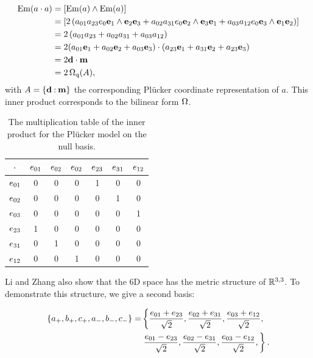 \begin{align*}
  \operatorname{Em}(a \mathbin{\cdot} a) &= \left[\operatorname{Em}(a) \wedge \operatorname{Em}(a)\right] \\
    &= \left[ 2 \left( a_{01} a_{23} e_0\mathbf{e}_1 \wedge \mathbf{e}_2\mathbf{e}_3 + a_{02} a_{31} e_0\mathbf{e}_2 \wedge \mathbf{e}_3\mathbf{e}_1 + a_{03} a_{12} e_0\mathbf{e}_3 \wedge \mathbf{e}_1\mathbf{e}_2 \right) \right] \\
    &= 2 \left( a_{01} a_{23} + a_{02} a_{31} + a_{03} a_{12} \right) \\
    &= 2 (a_{01} \mathbf{e}_1 + a_{02} \mathbf{e}_2 + a_{03} \mathbf{e}_3) \mathbin{\cdot} (a_{23} \mathbf{e}_1 + a_{31} \mathbf{e}_2 + a_{23} \mathbf{e}_3) \\
    &= 2 \mathbf{d} \mathbin{\cdot} \mathbf{m} \\ 
    &= 2 \operatorname{\Omega_q}(A),
\end{align*}
with $A = \{\mathbf{d} \mathbin{:} \mathbf{m}\}$ the corresponding Pl\"ucker coordinate representation of $a$.  This inner product corresponds to the bilinear form $\operatorname{\Omega}$.

\begin{table}[t]
  \caption{The multiplication table of the inner product for the Pl\"ucker model on the null basis.}
  \label{tab:nullmetric}
  \begin{center}
    \begin{tabular}{|c||c|c|c|c|c|c|}
      \hline
      $\mathbin{\cdot}$ & $e_{01}$ & $e_{02}$ & $e_{02}$ & $e_{23}$ & $e_{31}$ & $e_{12}$ \\
      \hline \hline
      $e_{01}$ & 0 & 0 & 0 & 1 & 0 & 0 \\
      \hline
      $e_{02}$ & 0 & 0 & 0 & 0 & 1 & 0 \\
      \hline
      $e_{03}$ & 0 & 0 & 0 & 0 & 0 & 1 \\
      \hline
      $e_{23}$ & 1 & 0 & 0 & 0 & 0 & 0 \\
      \hline
      $e_{31}$ & 0 & 1 & 0 & 0 & 0 & 0 \\
      \hline
      $e_{12}$ & 0 & 0 & 1 & 0 & 0 & 0 \\
      \hline
    \end{tabular}
  \end{center}
\end{table}

Li and Zhang also show that the 6D space has the metric structure of $\mathbb{R}^{3,3}$.  To demonstrate this structure, we give a second basis:

\begin{equation*}
  \begin{split}
  \left\{a_{+}, b_{+}, c_{+}, a_{-}, b_{-}, c_{-}\right\} =
    & \left\{ \frac{e_{01} + e_{23}}{\sqrt{2}}, \frac{e_{02} + e_{31}}{\sqrt{2}}, \frac{e_{03} + e_{12}}{\sqrt{2}}, \right.\\
    & \left.  \frac{e_{01} - e_{23}}{\sqrt{2}}, \frac{e_{02} - e_{31}}{\sqrt{2}}, \frac{e_{03} - e_{12}}{\sqrt{2}}, \right\}
.
\end{split}
\end{equation*}

